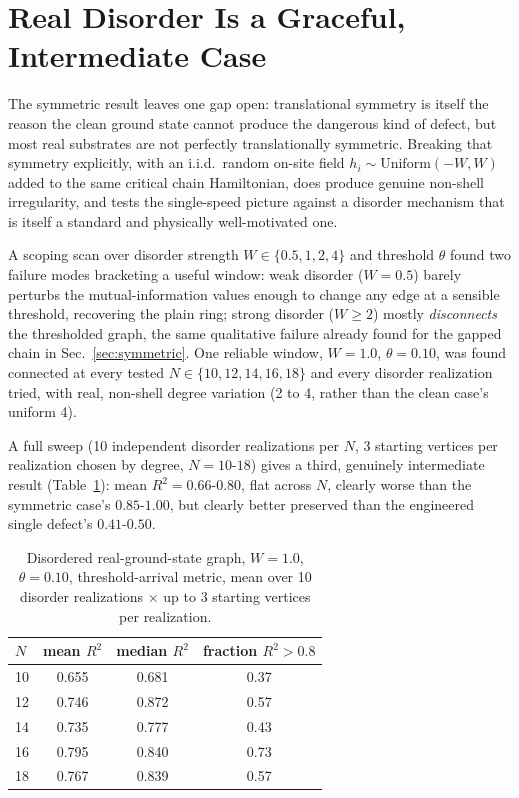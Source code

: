 \documentclass[11pt]{article}
\begin{document}
\section{Real Disorder Is a Graceful, Intermediate Case}
\label{sec:disorder}

The symmetric result leaves one gap open: translational symmetry is itself the reason the clean ground state cannot produce the dangerous kind of defect, but most real substrates are not perfectly translationally symmetric. Breaking that symmetry explicitly, with an i.i.d.\ random on-site field $h_i\sim\mathrm{Uniform}(-W,W)$ added to the same critical chain Hamiltonian, does produce genuine non-shell irregularity, and tests the single-speed picture against a disorder mechanism that is itself a standard and physically well-motivated one.

A scoping scan over disorder strength $W\in\{0.5,1,2,4\}$ and threshold $\theta$ found two failure modes bracketing a useful window: weak disorder ($W=0.5$) barely perturbs the mutual-information values enough to change any edge at a sensible threshold, recovering the plain ring; strong disorder ($W\geq2$) mostly \emph{disconnects} the thresholded graph, the same qualitative failure already found for the gapped chain in Sec.~\ref{sec:symmetric}. One reliable window, $W=1.0$, $\theta=0.10$, was found connected at every tested $N\in\{10,12,14,16,18\}$ and every disorder realization tried, with real, non-shell degree variation (2 to 4, rather than the clean case's uniform 4).

A full sweep (10 independent disorder realizations per $N$, 3 starting vertices per realization chosen by degree, $N=10$-$18$) gives a third, genuinely intermediate result (Table~\ref{tab:disorder}): mean $R^2=0.66$-$0.80$, flat across $N$, clearly worse than the symmetric case's $0.85$-$1.00$, but clearly better preserved than the engineered single defect's $0.41$-$0.50$.

\begin{table}[h]
\centering
\caption{Disordered real-ground-state graph, $W=1.0$, $\theta=0.10$, threshold-arrival metric, mean over 10 disorder realizations $\times$ up to 3 starting vertices per realization.}
\label{tab:disorder}
\begin{tabular}{@{}lccc@{}}
\toprule
$N$ & mean $R^2$ & median $R^2$ & fraction $R^2>0.8$ \\
\midrule
10 & 0.655 & 0.681 & 0.37 \\
12 & 0.746 & 0.872 & 0.57 \\
14 & 0.735 & 0.777 & 0.43 \\
16 & 0.795 & 0.840 & 0.73 \\
18 & 0.767 & 0.839 & 0.57 \\
\bottomrule
\end{tabular}
\end{table}
\end{document}
